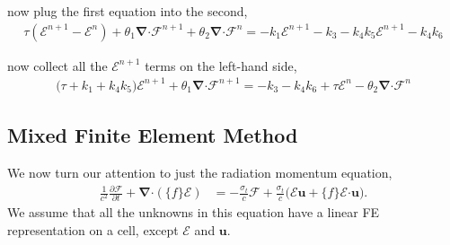 \documentclass[10pt,letterpaper,notitlepage]{article}
\numberwithin{equation}{section}
\newcommand{\partialderiv}[2]{\frac{\partial #1}{\partial #2}}
\newcommand{\bnabla}{\boldsymbol{\nabla}}
\newcommand{\velocity}{\mathbf{u}}
\newcommand{\dotp}{\boldsymbol{\cdot}}
\newcommand{\RadE}{\mathcal{E}}
\newcommand{\RadF}{\boldsymbol{\mathcal{F}}}
\newcommand{\VEFf}{\{ f \}}
\newcommand{\beqn}{\begin{equation}\begin{aligned}}
\newcommand{\eeqn}{\end{aligned}\end{equation}}
\newcommand{\splitline}{\noindent\makebox[\linewidth]{\rule{\paperwidth}{0.4pt}}}
\begin{document}
\splitline

now plug the first equation into the second,
\begin{subequations}
	\beqn 
	\tau (\RadE^{n+1} - \RadE^{n}) 
	+ \theta_1 \bnabla \dotp  \RadF^{n+1} + \theta_2 \bnabla \dotp \RadF^{n} = 
	-k_1\RadE^{n+1} 
	-k_3
	-k_4 k_5 \RadE^{n+1} -k_4 k_6
	\eeqn
\end{subequations}

\splitline

now collect all the $\RadE^{n+1}$ terms on the left-hand side,
\begin{subequations}
	\beqn 
	\big( \tau + k_1 + k_4 k_5\big) \RadE^{n+1} 
	+ \theta_1 \bnabla \dotp  \RadF^{n+1} = 
	-k_3
	-k_4 k_6
	+ \tau \RadE^{n}
	- \theta_2 \bnabla \dotp \RadF^{n}
	\eeqn
\end{subequations}

\splitline 



\vspace{1cm}
\subsection{Mixed Finite Element Method}
We now turn our attention to just the radiation momentum equation,
\beqn 
\frac{1}{c^2} \partialderiv{\RadF}{t} + \bnabla \dotp (\VEFf \RadE) &= -\frac{\sigma_t}{c}\RadF + \frac{\sigma_t}{c} \bigr( \RadE \velocity+\VEFf\RadE \dotp \velocity \bigr).
\eeqn 
We assume that all the unknowns in this equation have a linear FE representation on a cell, except $\RadE$ and $\velocity$. 
\end{document}
